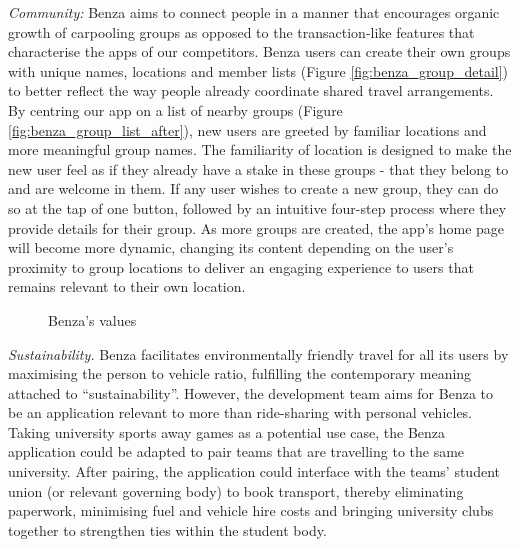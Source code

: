 \documentclass{article}
\begin{document}
    \emph{Community:} Benza aims to connect people in a manner that encourages organic growth of carpooling groups as opposed to the transaction-like features that characterise the \glspl{app} of our competitors. Benza users can create their own groups with unique names, locations and member lists (Figure \ref{fig:benza_group_detail}) to better reflect the way people already coordinate shared travel arrangements. By centring our \gls{app} on a list of nearby groups (Figure \ref{fig:benza_group_list_after}), new users are greeted by familiar locations and more meaningful group names. The familiarity of location is designed to make the new user feel as if they already have a stake in these groups - that they belong to and are welcome in them. If any user wishes to create a new group, they can do so at the tap of one button, followed by an intuitive four-step process where they provide details for their group. As more groups are created, the \gls{app}'s home page will become more dynamic, changing its content depending on the user's proximity to group locations to deliver an engaging experience to users that remains relevant to their own location. \par
    
    \begin{wrapfigure}{l}{0.4\textwidth}
        \vspace{-5pt}
        \caption{Benza's values}
        \label{fig:values}
        \vspace{-10pt}
    \end{wrapfigure}
    
    \emph{Sustainability.} Benza facilitates environmentally friendly travel for all its users by maximising the person to vehicle ratio, fulfilling the contemporary meaning attached to ``sustainability''. However, the development team aims for Benza to be an application relevant to more than ride-sharing with personal vehicles. Taking university sports away games as a potential use case, the Benza application could be adapted to pair teams that are travelling to the same university. After pairing, the application could interface with the teams' student union (or relevant governing body) to book transport, thereby eliminating paperwork, minimising fuel and vehicle hire costs and bringing university clubs together to strengthen ties within the student body. \par 
    
\end{document}
